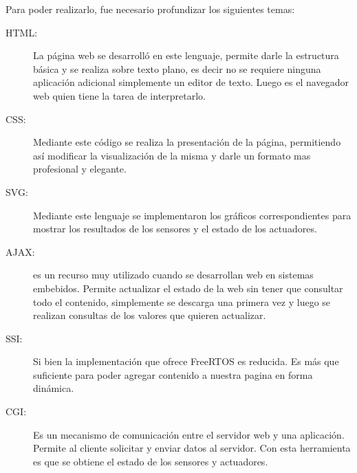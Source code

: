 Para poder realizarlo, fue necesario profundizar los siguientes temas:
\begin{description}
  \item[HTML:] La página web se desarrolló en este lenguaje, permite darle la estructura básica y se realiza sobre texto plano, es decir no se requiere ninguna aplicación adicional simplemente un editor de texto. Luego es el navegador web quien tiene la tarea de interpretarlo. 
  \item[CSS:] Mediante este código se realiza la presentación de la página, permitiendo así modificar la visualización de la misma y darle un formato mas profesional y elegante.
  \item[SVG:] Mediante este lenguaje se implementaron los gráficos correspondientes para mostrar los resultados de los sensores y el estado de los actuadores.
  \item[AJAX:] es un recurso muy utilizado cuando se desarrollan web en sistemas embebidos. Permite actualizar el estado de la web sin tener que consultar todo el contenido, simplemente se descarga una primera vez y luego se realizan consultas de los valores que quieren actualizar. 
  \item[SSI:] Si bien la implementación que ofrece FreeRTOS es reducida. Es más que suficiente para poder agregar contenido a nuestra pagina en forma dinámica.
  \item[CGI:] Es un mecanismo de comunicación entre el servidor web y una aplicación. Permite al cliente solicitar y enviar datos al servidor. Con esta herramienta es que se obtiene el estado de los sensores y actuadores.
\end{description}

